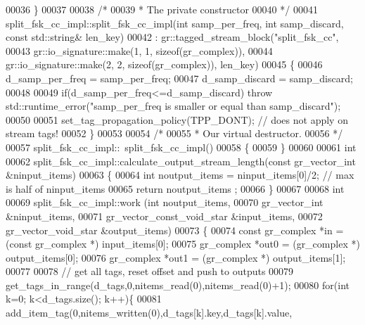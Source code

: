 \begin{DoxyCode}
00036     \}
00037 
00038     \textcolor{comment}{/*}
00039 \textcolor{comment}{     * The private constructor}
00040 \textcolor{comment}{     */}
00041     split_fsk_cc_impl::split_fsk_cc_impl(\textcolor{keywordtype}{int} samp_per_freq, \textcolor{keywordtype}{int} samp\_discard, \textcolor{keyword}{const} 
      std::string& len\_key)
00042       : gr::tagged\_stream\_block(\textcolor{stringliteral}{"split\_fsk\_cc"},
00043               gr::io\_signature::make(1, 1, sizeof(gr\_complex)),
00044               gr::io\_signature::make(2, 2, sizeof(gr\_complex)), len\_key)
00045     \{
00046         d_samp_per_freq = samp_per_freq;
00047         d_samp_discard = samp\_discard;
00048         
00049         \textcolor{keywordflow}{if}(d_samp_per_freq<=d_samp_discard) \textcolor{keywordflow}{throw} std::runtime\_error(\textcolor{stringliteral}{"samp\_per\_freq is smaller or equal
       than samp\_discard"});
00050         
00051         set\_tag\_propagation\_policy(TPP\_DONT); \textcolor{comment}{// does not apply on stream tags!}
00052     \}
00053 
00054     \textcolor{comment}{/*}
00055 \textcolor{comment}{     * Our virtual destructor.}
00056 \textcolor{comment}{     */}
00057     split_fsk_cc_impl::~split_fsk_cc_impl()
00058     \{
00059     \}
00060 
00061     \textcolor{keywordtype}{int}
00062     split_fsk_cc_impl::calculate_output_stream_length(\textcolor{keyword}{const} gr\_vector\_int &ninput\_items)
00063     \{
00064       \textcolor{keywordtype}{int} noutput\_items = ninput\_items[0]/2; \textcolor{comment}{// max is half of ninput\_items}
00065       \textcolor{keywordflow}{return} noutput\_items ;
00066     \}
00067 
00068     \textcolor{keywordtype}{int}
00069     split_fsk_cc_impl::work (\textcolor{keywordtype}{int} noutput\_items,
00070                        gr\_vector\_int &ninput\_items,
00071                        gr\_vector\_const\_void\_star &input\_items,
00072                        gr\_vector\_void\_star &output\_items)
00073     \{
00074         \textcolor{keyword}{const} gr\_complex *in = (\textcolor{keyword}{const} gr\_complex *) input\_items[0];
00075         gr\_complex *out0 = (gr\_complex *) output\_items[0];
00076         gr\_complex *out1 = (gr\_complex *) output\_items[1];
00077         
00078         \textcolor{comment}{// get all tags, reset offset and push to outputs}
00079         get\_tags\_in\_range(d_tags,0,nitems\_read(0),nitems\_read(0)+1);
00080         \textcolor{keywordflow}{for}(\textcolor{keywordtype}{int} k=0; k<d_tags.size(); k++)\{
00081             add\_item\_tag(0,nitems\_written(0),d_tags[k].key,d_tags[k].value,

\end{DoxyCode}
